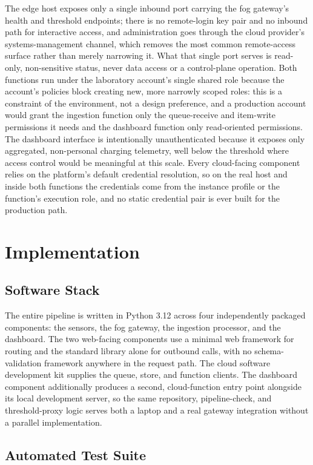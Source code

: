 \documentclass[conference]{IEEEtran}
\begin{document}
The edge host exposes only a single inbound port carrying the fog gateway's health and threshold endpoints; there is no remote-login key pair and no inbound path for interactive access, and administration goes through the cloud provider's systems-management channel, which removes the most common remote-access surface rather than merely narrowing it. What that single port serves is read-only, non-sensitive status, never data access or a control-plane operation. Both functions run under the laboratory account's single shared role because the account's policies block creating new, more narrowly scoped roles: this is a constraint of the environment, not a design preference, and a production account would grant the ingestion function only the queue-receive and item-write permissions it needs and the dashboard function only read-oriented permissions. The dashboard interface is intentionally unauthenticated because it exposes only aggregated, non-personal charging telemetry, well below the threshold where access control would be meaningful at this scale. Every cloud-facing component relies on the platform's default credential resolution, so on the real host and inside both functions the credentials come from the instance profile or the function's execution role, and no static credential pair is ever built for the production path.

\section{Implementation}

\subsection{Software Stack}

The entire pipeline is written in Python 3.12 across four independently packaged components: the sensors, the fog gateway, the ingestion processor, and the dashboard. The two web-facing components use a minimal web framework for routing and the standard library alone for outbound calls, with no schema-validation framework anywhere in the request path. The cloud software development kit supplies the queue, store, and function clients. The dashboard component additionally produces a second, cloud-function entry point alongside its local development server, so the same repository, pipeline-check, and threshold-proxy logic serves both a laptop and a real gateway integration without a parallel implementation.

\subsection{Automated Test Suite}
\end{document}
